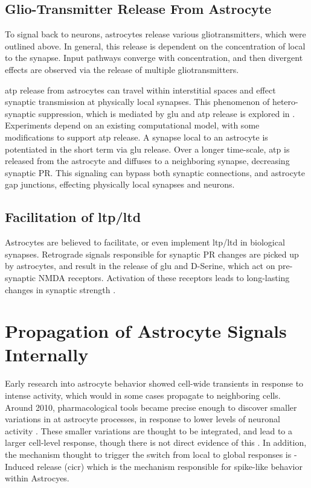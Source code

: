     \subsection{Glio-Transmitter Release From Astrocyte}
    To signal back to neurons, astrocytes release various gliotransmitters,
    which were outlined above. In general, this release is dependent on the
    concentration of \ca local to the synapse. Input pathways converge with
    \ca concentration, and then divergent effects are observed via the release
    of multiple gliotransmitters.

    \Gls{atp} release from astrocytes can travel within interstitial spaces and
    effect synaptic transmission at physically local synapses. This phenomenon
    of hetero-synaptic suppression, which is mediated by \gls{glu} and \gls{atp}
    release is explored in \parencite{postnov_2009}. Experiments depend on an
    existing computational model, with some modifications to support \gls{atp}
    release. A synapse local to an astrocyte is potentiated in the short term
    via \gls{glu} release. Over a longer time-scale, \gls{atp} is released from
    the astrocyte and diffuses to a neighboring synapse, decreasing synaptic
    PR. This signaling can bypass both synaptic connections, and astrocyte gap
    junctions, effecting physically local synapses and neurons.

    \subsection{Facilitation of \Gls{ltp}/\Gls{ltd}}
    Astrocytes are believed to facilitate, or even implement \gls{ltp}/\gls{ltd} in
    biological synapses. Retrograde signals responsible for synaptic PR changes
    are picked up by astrocytes, and result in the release of \gls{glu} and D-Serine,
    which act on pre-synaptic NMDA receptors. Activation of these receptors
    leads to long-lasting changes in synaptic strength \parencite{min_2012}.

    \section{Propagation of Astrocyte Signals Internally}
    Early research into astrocyte behavior showed cell-wide \ca transients in
    response to intense activity, which would in some cases propagate to
    neighboring cells. Around 2010, pharmacological tools became precise enough
    to discover smaller variations in \ca at astrocyte processes, in response to
    lower levels of neuronal activity \parencite{manninen_2018}. These smaller
    variations are thought to be integrated, and lead to a larger cell-level \ca
    response, though there is not direct evidence of this
    \parencite{araque_2014}. In addition, the mechanism thought to trigger the
    switch from local to global responses is \ca-Induced \ca release
    (\gls{cicr}) which is the mechanism responsible for spike-like behavior
    within Astrocyes.

